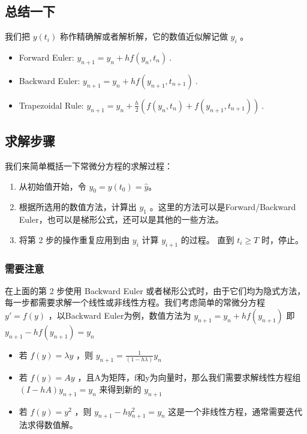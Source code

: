 \subsection{总结一下}

我们把 $y(t_i)$ 称作精确解或者解析解，它的数值近似解记做 $y_i$ 。
\begin{itemize}
\item Forward Euler: $y_{n+1}=y_n+hf(y_n,t_n)~.$ 
\item Backward Euler: $y_{n+1}=y_n+hf(y_{n+1},t_{n+1})~.$ 
\item Trapezoidal Rule: $y_{n+1}=y_n+\frac{h}{2}\left(f(y_n,t_n)+f(y_{n+1},t_{n+1}) \right)~.$ 
\end{itemize}


\subsection{求解步骤}

我们来简单概括一下常微分方程的求解过程：

\begin{enumerate}
\item 从初始值开始，令 $y_0=y(t_0)=\hat{y}$。
\item 根据所选用的数值方法，计算出 $y_1$ 。这里的方法可以是Forward/Backward Euler，也可以是梯形公式，还可以是其他的一些方法。
\item 将第 2 步的操作重复应用到由 $y_i$ 计算 $y_{i+1}$ 的过程。 直到 $t_i\ge T$ 时，停止。
\end{enumerate}

\subsubsection{需要注意}

在上面的第 2 步使用 Backward Euler 或者梯形公式时，由于它们均为隐式方法，每一步都需要求解一个线性或非线性方程。我们考虑简单的常微分方程 $y'=f(y)$ ，以Backward Euler为例，数值方法为 $y_{n+1}=y_{n}+hf(y_{n+1})$ 即 $y_{n+1}-hf(y_{n+1})=y_{n}$ 

\begin{itemize}
\item 若 $f(y)=\lambda y$ ，则 $y_{n+1}=\frac{1}{(1-h\lambda)}y_n$ 
\item 若 $f(y)=A y$ ，且A为矩阵，f和y为向量时，那么我们需要求解线性方程组 $(I-hA)y_{n+1}=y_n$ 来得到新的 $y_{n+1}$
\item 若 $f(y)=y^2$ ，则 $y_{n+1}-hy^2_{n+1} = y_n$ 这是一个非线性方程，通常需要迭代法求得数值解。
\end{itemize}

